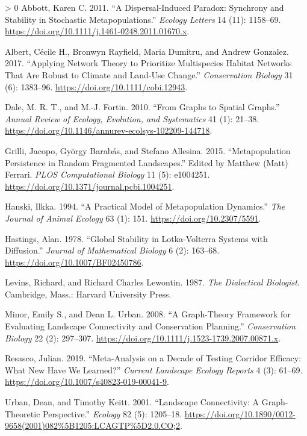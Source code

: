 \documentclass[11pt]{article}
\newlength{\cslhangindent}
\newenvironment{CSLReferences}[3] %
 {%
  \setlength{\parindent}{0pt}
  \ifodd #1 \everypar{\setlength{\hangindent}{\cslhangindent}}\ignorespaces\fi
  \ifnum #2 > 0
  \setlength{\parskip}{#2\baselineskip}
  \fi
 }%
 {}
\begin{document}
\hypertarget{refs}{}
\begin{CSLReferences}{1}{0}
\leavevmode\hypertarget{ref-Abbott2011DisPar}{}%
Abbott, Karen C. 2011. {``A Dispersal-Induced Paradox: Synchrony and
Stability in Stochastic Metapopulations.''} \emph{Ecology Letters} 14
(11): 1158--69. \url{https://doi.org/10.1111/j.1461-0248.2011.01670.x}.

\leavevmode\hypertarget{ref-Albert2017AppNet}{}%
Albert, Cécile H., Bronwyn Rayfield, Maria Dumitru, and Andrew Gonzalez.
2017. {``Applying Network Theory to Prioritize Multispecies Habitat
Networks That Are Robust to Climate and Land-Use Change.''}
\emph{Conservation Biology} 31 (6): 1383--96.
\url{https://doi.org/10.1111/cobi.12943}.

\leavevmode\hypertarget{ref-Dale2010GraSpa}{}%
Dale, M. R. T., and M.-J. Fortin. 2010. {``From Graphs to Spatial
Graphs.''} \emph{Annual Review of Ecology, Evolution, and Systematics}
41 (1): 21--38.
\url{https://doi.org/10.1146/annurev-ecolsys-102209-144718}.

\leavevmode\hypertarget{ref-Grilli2015MetPer}{}%
Grilli, Jacopo, György Barabás, and Stefano Allesina. 2015.
{``Metapopulation Persistence in Random Fragmented Landscapes.''} Edited
by Matthew (Matt) Ferrari. \emph{PLOS Computational Biology} 11 (5):
e1004251. \url{https://doi.org/10.1371/journal.pcbi.1004251}.

\leavevmode\hypertarget{ref-Hanski1994PraMod}{}%
Hanski, Ilkka. 1994. {``A Practical Model of Metapopulation Dynamics.''}
\emph{The Journal of Animal Ecology} 63 (1): 151.
\url{https://doi.org/10.2307/5591}.

\leavevmode\hypertarget{ref-Hastings1978GloSta}{}%
Hastings, Alan. 1978. {``Global Stability in Lotka-Volterra Systems with
Diffusion.''} \emph{Journal of Mathematical Biology} 6 (2): 163--68.
\url{https://doi.org/10.1007/BF02450786}.

\leavevmode\hypertarget{ref-Levins1987DiaBio}{}%
Levins, Richard, and Richard Charles Lewontin. 1987. \emph{The
Dialectical Biologist}. Cambridge, Mass.: Harvard University Press.

\leavevmode\hypertarget{ref-Minor2008GraFra}{}%
Minor, Emily S., and Dean L. Urban. 2008. {``A Graph-Theory Framework
for Evaluating Landscape Connectivity and Conservation Planning.''}
\emph{Conservation Biology} 22 (2): 297--307.
\url{https://doi.org/10.1111/j.1523-1739.2007.00871.x}.

\leavevmode\hypertarget{ref-Resasco2019MetDec}{}%
Resasco, Julian. 2019. {``Meta-Analysis on a Decade of Testing Corridor
Efficacy: What New Have We Learned?''} \emph{Current Landscape Ecology
Reports} 4 (3): 61--69.
\url{https://doi.org/10.1007/s40823-019-00041-9}.

\leavevmode\hypertarget{ref-Urban2001LanCon}{}%
Urban, Dean, and Timothy Keitt. 2001. {``Landscape Connectivity: A
Graph-Theoretic Perspective.''} \emph{Ecology} 82 (5): 1205--18.
\url{https://doi.org/10.1890/0012-9658(2001)082\%5B1205:LCAGTP\%5D2.0.CO;2}.

\end{CSLReferences}
\end{document}
